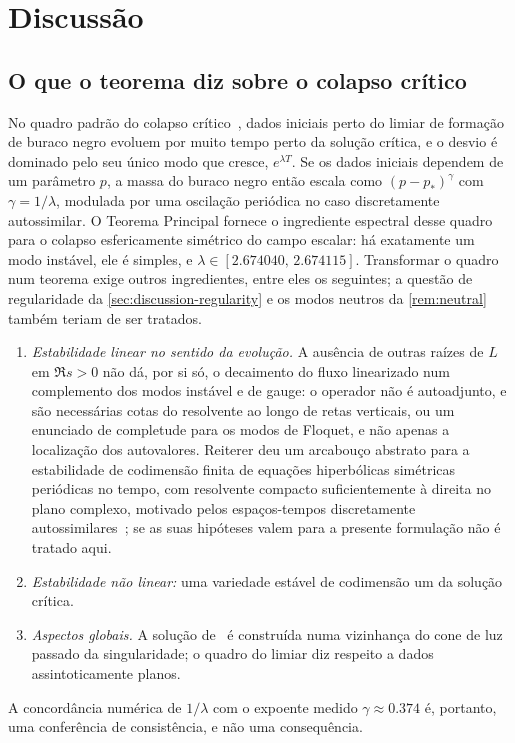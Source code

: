 \section{Discussão}\label{sec:discussion}

\subsection{O que o teorema diz sobre o colapso crítico}

No quadro padrão do colapso crítico~\cite{GundlachMartinGarcia2007}, dados iniciais perto do limiar de
formação de buraco negro evoluem por muito tempo perto da solução crítica, e o desvio é dominado pelo seu
único modo que cresce, $e^{\lambda T}$. Se os dados iniciais dependem de um parâmetro $p$, a massa do buraco negro então
escala como $(p-p_*)^\gamma$ com $\gamma=1/\lambda$, modulada por uma oscilação periódica no caso discretamente
autossimilar. O Teorema Principal fornece o ingrediente espectral desse quadro para o colapso esfericamente simétrico do
campo escalar: há exatamente um modo instável, ele é simples, e $\lambda\in[2.674040,\,2.674115]$. Transformar o
quadro num teorema exige outros ingredientes, entre eles os seguintes; a questão de regularidade da
\cref{sec:discussion-regularity} e os modos neutros da \cref{rem:neutral} também teriam de ser tratados.
\begin{enumerate}[label=(\alph*),leftmargin=*]
\item \emph{Estabilidade linear no sentido da evolução.} A ausência de outras raízes de $L$ em $\Re s>0$ não dá, por
  si só, o decaimento do fluxo linearizado num complemento dos modos instável e de gauge: o operador não é
  autoadjunto, e são necessárias cotas do resolvente ao longo de retas verticais, ou um enunciado de completude para os modos de
  Floquet, e não apenas a localização dos autovalores. Reiterer deu um arcabouço abstrato para a estabilidade de
  codimensão finita de equações hiperbólicas simétricas periódicas no tempo, com resolvente compacto suficientemente à direita no plano
  complexo, motivado pelos espaços-tempos discretamente autossimilares~\cite{Reiterer2015}; se as suas hipóteses valem para a
  presente formulação não é tratado aqui.
\item \emph{Estabilidade não linear:} uma variedade estável de codimensão um da solução crítica.
\item \emph{Aspectos globais.} A solução de~\cite{RT2019} é construída numa vizinhança do cone de luz passado
  da singularidade; o quadro do limiar diz respeito a dados assintoticamente planos.
\end{enumerate}
A concordância numérica de $1/\lambda$ com o expoente medido $\gamma\approx0.374$ é, portanto, uma conferência de
consistência, e não uma consequência.

